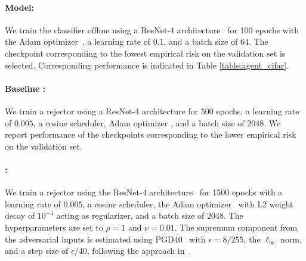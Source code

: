 \begin{appendices}
\paragraph{Model:} We train the classifier offline using a ResNet-4 architecture~\citep{he2015deepresiduallearningimage} for 100 epochs with the Adam optimizer~\citep{kingma2017adammethodstochasticoptimization}, a learning rate of $0.1$, and a batch size of $64$. The checkpoint corresponding to the lowest empirical risk on the validation set is selected. Corresponding performance is indicated in Table \ref{table:agent_cifar}. 

\begin{table}[ht]
\centering{}
\caption{Agent accuracies on the CIFAR-100 validation set. Since the training and validation sets are pre-determined in this dataset, the agents' knowledge remains fixed throughout the evaluation.}
\label{table:agent_cifar}
\end{table}

\paragraph{Baseline \citep{mao2023twostage}:} We train a rejector using a ResNet-4 \citep{he2015deepresiduallearningimage} architecture for $500$ epochs, a learning rate of $0.005$, a cosine scheduler, Adam optimizer \citep{kingma2017adammethodstochasticoptimization}, and a batch size of $2048$. We report performance of the checkpoints corresponding to the lower empirical risk on the validation set. 

\paragraph{\name{}:} We train a rejector using the ResNet-4 architecture~\citep{he2015deepresiduallearningimage} for 1500 epochs with a learning rate of $0.005$, a cosine scheduler, the Adam optimizer~\citep{kingma2017adammethodstochasticoptimization} with L2 weight decay of $10^{-4}$ acting as regularizer, and a batch size of $2048$. The hyperparameters are set to $\rho = 1$ and $\nu = 0.01$. The supremum component from the adversarial inputs is estimated using PGD40~\citep{Madry2017TowardsDL} with $\epsilon = 8/255$, the $\ell_\infty$ norm, and a step size of $\epsilon / 40$, following the approach in~\citep{mao2023crossentropylossfunctionstheoretical, Grounded}.


\end{appendices}
